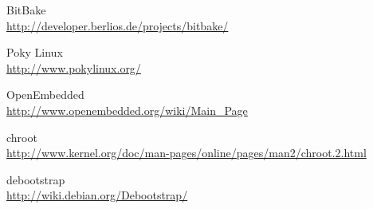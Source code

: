 \documentclass[a4paper,11pt,openany]{report}
\begin{document}
\begin{thebibliography}{ZZ}
BitBake\\
\url{http://developer.berlios.de/projects/bitbake/}

Poky Linux\\
\url{http://www.pokylinux.org/}

OpenEmbedded\\
\url{http://www.openembedded.org/wiki/Main_Page}

chroot\\
\url{http://www.kernel.org/doc/man-pages/online/pages/man2/chroot.2.html}

debootstrap\\
\url{http://wiki.debian.org/Debootstrap/}


\end{thebibliography}
\end{document}
